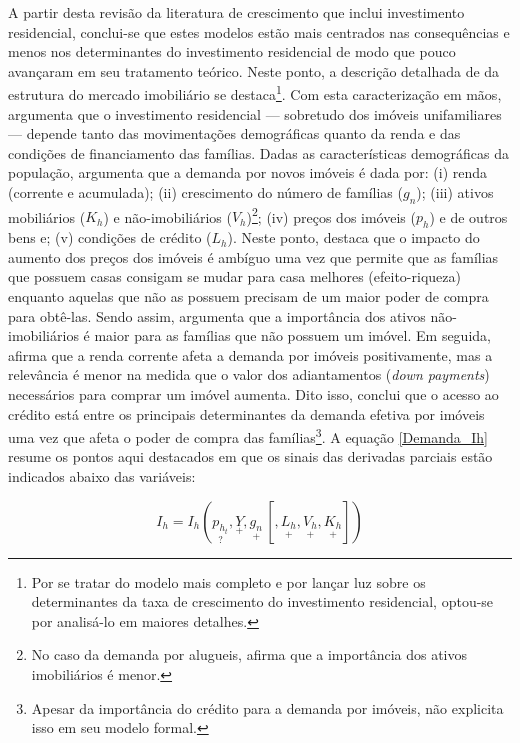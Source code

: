 A partir desta revisão da literatura de crescimento que inclui investimento residencial, 
conclui-se que estes modelos estão mais centrados nas consequências e menos nos determinantes do investimento residencial de modo que pouco avançaram em seu tratamento teórico.
Neste ponto, a descrição detalhada de \textcite{duesenberry_investment_1958} da estrutura do mercado imobiliário se destaca\footnote{
	Por se tratar do modelo mais completo e por lançar luz sobre os determinantes da taxa de crescimento do investimento residencial, optou-se por analisá-lo em maiores detalhes.
}.
Com esta caracterização em mãos, argumenta que o investimento residencial --- sobretudo dos imóveis unifamiliares --- depende tanto das movimentações demográficas quanto da renda e das condições de financiamento das famílias.
Dadas as características demográficas da população, argumenta que a demanda por novos imóveis é dada por:
	(i) renda (corrente e acumulada);
	(ii) crescimento do número de famílias ($g_n$);
	(iii) ativos mobiliários ($K_h$) e não-imobiliários ($V_h$)\footnote{No caso da demanda por alugueis, \textcite{duesenberry_investment_1958} afirma que a importância dos ativos imobiliários é menor.};
	(iv) preços dos imóveis ($p_h$) e de outros bens e;
	(v) condições de crédito ($L_h$).
Neste ponto, \textcite{duesenberry_investment_1958} destaca que o impacto do aumento dos preços dos imóveis é ambíguo uma vez que permite que as famílias que possuem casas consigam se mudar para casa melhores (efeito-riqueza) enquanto aquelas que não as possuem  precisam de um maior poder de compra para obtê-las.
Sendo assim, argumenta que a importância dos ativos não-imobiliários é maior para as famílias que não possuem um imóvel.
Em seguida, afirma que a renda corrente afeta a demanda por imóveis positivamente, mas a relevância é menor na medida que o valor dos adiantamentos (\textit{down payments}) necessários para comprar um imóvel aumenta.
Dito isso, conclui que o acesso ao crédito está entre os principais determinantes da demanda efetiva por imóveis uma vez que afeta o poder de compra das famílias\footnote{
Apesar da importância do crédito para a demanda por imóveis, \textcite{duesenberry_investment_1958} não explicita isso em seu modelo formal.
}.
A equação \ref{Demanda_Ih} resume os pontos aqui destacados em que os sinais das derivadas parciais estão indicados abaixo das variáveis:

\begin{equation}
\label{Demanda_Ih}
I_{h} = I_h(\underset{?}{p_{h_t}}, \underset{+}{Y}, \underset{+}{g_n}\, [, \underset{+}{L_h}, \underset{+}{V_h}, \underset{+}{K_h}])
\end{equation}


